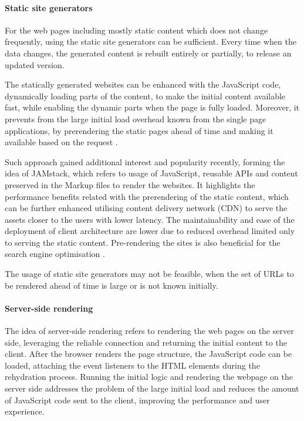 \paragraph*{Static site generators}

For the web pages including mostly static content which does not change frequently, using the static site generators can be sufficient. Every time when the data changes, the generated content is rebuilt entirely or partially, to release an updated version.

The statically generated websites can be enhanced with the JavaScript code, dynamically loading parts of the content, to make the initial content available fast, while enabling the dynamic parts when the page is fully loaded. Moreover, it prevents from the large initial load overhead known from the single page applications, by prerendering the static pages ahead of time and making it available based on the request \cite{GoogleRenderingOnTheWeb}.

Such approach gained additional interest and popularity recently, forming the idea of JAMstack, which refers to usage of JavaScript, reusable APIs and content preserved in the Markup files to render the websites. It highlights the performance benefits related with the prerendering of the static content, which can be further enhanced utilising content delivery network (CDN) to serve the assets closer to the users with lower latency. The maintainability and ease of the deployment of client architecture are lower due to reduced overhead limited only to serving the static content. Pre-rendering the sites is also beneficial for the search engine optimisation \cite{JAMstack}.

The usage of static site generators may not be feasible, when the set of URLs to be rendered ahead of time is large or is not known initially.

\paragraph*{Server-side rendering}

The idea of server-side rendering refers to rendering the web pages on the server side, leveraging the reliable connection and returning the initial content to the client. After the browser renders the page structure, the JavaScript code can be loaded, attaching the event listeners to the HTML elements during the rehydration process. Running the initial logic and rendering the webpage on the server side addresses the problem of the large initial load and reduces the amount of JavaScript code sent to the client, improving the performance and user experience.

